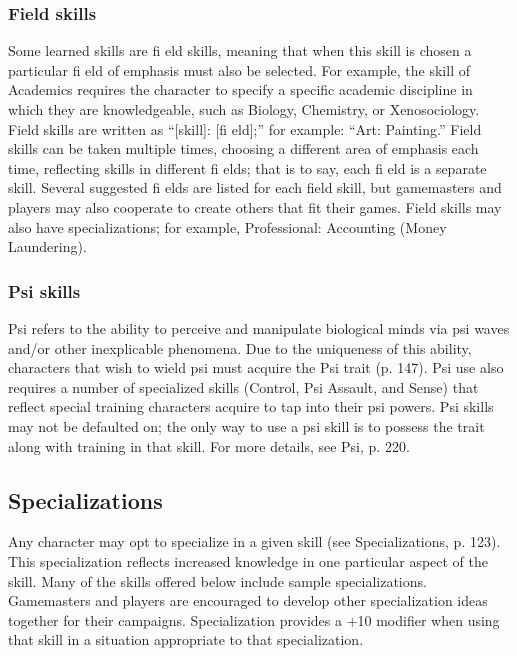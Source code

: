 \subsubsection{Field skills}
\label{sec:fieldskills}

Some learned skills are fi eld skills, meaning that when this skill is chosen a particular fi eld of emphasis must also be selected. For example, the skill of Academics requires the character to specify a specific academic discipline in which they are knowledgeable, such as Biology, Chemistry, or Xenosociology. Field skills are written as “[skill]: [fi eld];” for example: “Art: Painting.” Field skills can be taken multiple times, choosing a different area of emphasis each time, reflecting skills in different fi elds; that is to say, each fi eld is a separate skill. Several suggested fi elds are listed for each field
skill, but gamemasters and players may also cooperate to create others that fit their games. Field skills may also have specializations; for example, Professional: Accounting (Money Laundering).


\subsubsection{Psi skills}
\label{sec:psiskills}

Psi refers to the ability to perceive and manipulate biological minds via psi waves and/or other inexplicable phenomena. Due to the uniqueness of this ability, characters that wish to wield psi must acquire the Psi trait (p. 147). Psi use also requires a number of specialized skills (Control, Psi Assault, and Sense) that reflect special training characters acquire to tap into their psi powers. Psi skills may not be defaulted on; the only way to use a psi skill is to possess the trait
along with training in that skill. For more details, see Psi, p. 220.


\subsection{Specializations}
\label{sec:specializations}
Any character may opt to specialize in a given skill (see Specializations, p. 123). This specialization reflects increased knowledge in one particular aspect of the skill. Many of the skills offered below include sample specializations. Gamemasters and players are encouraged to develop other specialization ideas together for their campaigns. Specialization provides a +10 modifier when using that skill in a situation appropriate to that specialization.


